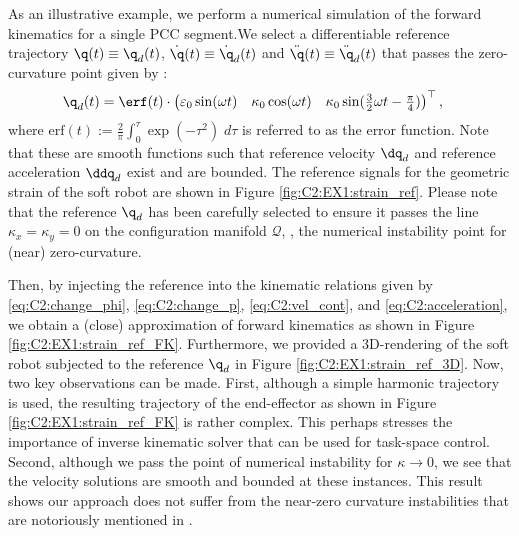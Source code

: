 \begin{example}
As an illustrative example, we perform a numerical simulation of the forward kinematics for a single PCC segment.\editl We select a differentiable reference trajectory $\q(t) \equiv \q_d(t)$, $\dot{\q}(t) \equiv \dot{\q}_d(t)$ and $\ddot{\q}(t) \equiv \ddot{\q}_d(t)$ that passes the zero-curvature point  given by \editr:
%
\begin{align*}
\q_d(t) &  =  \erf(t) \cdot \begin{pmatrix} \varepsilon_0 \sin(\omega t) & \kappa_0 \cos(\omega t) & \kappa_0 \sin(\tfrac{3}{2}\omega t - \tfrac{\pi}{4}) \end{pmatrix}^\top,
\end{align*}
%
where $\textrm{erf}(t) := \frac{2}{\pi}\int_0^\tau \exp(-\tau^2) \; d\tau$ is referred to as the error function. Note that these are smooth functions such that reference velocity $\dq_d$ and reference acceleration $\ddq_d$ exist and are bounded. The reference signals for the geometric strain of the soft robot are shown in Figure \ref{fig:C2:EX1:strain_ref}. Please note that the reference $\q_d$ has been carefully selected to ensure it passes the line $\kappa_x = \kappa_y = 0$ on the configuration manifold
$\mathcal{Q}$, \ie, the numerical instability point for (near) zero-curvature.

Then, by injecting the reference into the kinematic relations given by \eqref{eq:C2:change_phi}, \eqref{eq:C2:change_p}, \eqref{eq:C2:vel_cont}, and \eqref{eq:C2:acceleration}, we obtain a (close) approximation of forward kinematics as shown in Figure
\ref{fig:C2:EX1:strain_ref_FK}. Furthermore, we provided a 3D-rendering of the soft robot subjected to the reference $\q_d$ in Figure \ref{fig:C2:EX1:strain_ref_3D}. Now, two key observations can be made. First, although a simple harmonic trajectory is used, the resulting trajectory of the end-effector as shown in Figure \ref{fig:C2:EX1:strain_ref_FK} is rather complex. This perhaps stresses the importance of inverse kinematic solver that can be used for task-space control. Second, although we pass the point of numerical instability for $\kappa \to 0$, we see that the velocity solutions are smooth and bounded at these instances. This result shows our approach does not suffer from the near-zero curvature instabilities that are notoriously mentioned in \cite{Falkenhahn2015,DellaSantina2020}. 
\end{example}

